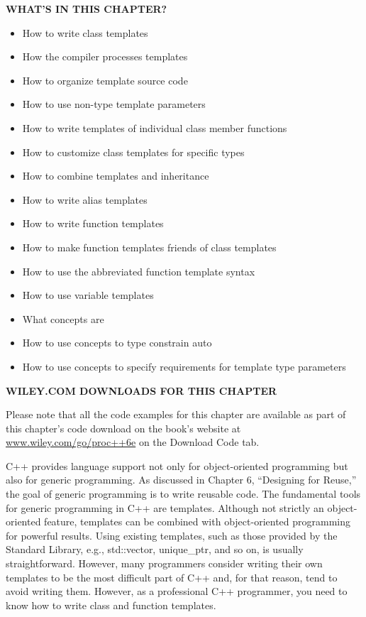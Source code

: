 \noindent
\textbf{WHAT’S IN THIS CHAPTER?}

\begin{itemize}
\item
How to write class templates

\item
How the compiler processes templates

\item
How to organize template source code

\item
How to use non-type template parameters

\item
How to write templates of individual class member functions

\item
How to customize class templates for specific types

\item
How to combine templates and inheritance

\item
How to write alias templates

\item
How to write function templates

\item
How to make function templates friends of class templates

\item
How to use the abbreviated function template syntax

\item
How to use variable templates

\item
What concepts are

\item
How to use concepts to type constrain auto

\item
How to use concepts to specify requirements for template type parameters
\end{itemize}

\noindent
\textbf{WILEY.COM DOWNLOADS FOR THIS CHAPTER}

Please note that all the code examples for this chapter are available as part of this chapter’s code download on the book’s website at \url{www.wiley.com/go/proc++6e} on the Download Code tab.

C++ provides language support not only for object-oriented programming but also for generic programming. As discussed in Chapter 6, “Designing for Reuse,” the goal of generic programming is to write reusable code. The fundamental tools for generic programming in C++ are templates. Although not strictly an object-oriented feature, templates can be combined with object-oriented programming for powerful results. Using existing templates, such as those provided by the Standard Library, e.g., std::vector, unique\_ptr, and so on, is usually straightforward. However, many programmers consider writing their own templates to be the most difficult part of C++ and, for that reason, tend to avoid writing them. However, as a professional C++ programmer, you need to know how to write class and function templates.

